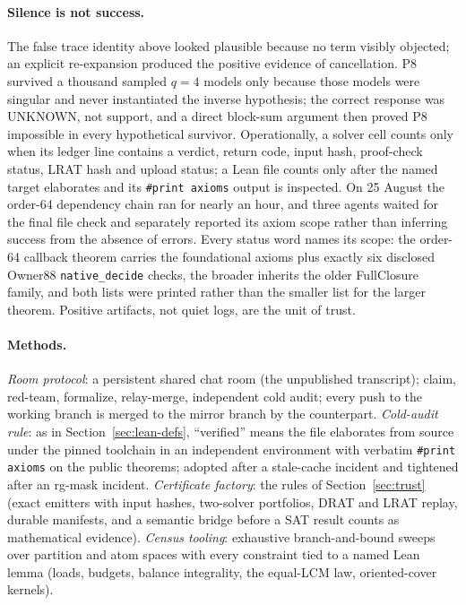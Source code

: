 \documentclass{anvil-paper}
\theoremstyle{definition}
\begin{document}
\paragraph{Silence is not success.} The false trace identity above looked plausible because no term visibly objected; an explicit re-expansion produced the positive evidence of cancellation. P8 survived a thousand sampled $q=4$ models only because those models were singular and never instantiated the inverse hypothesis; the correct response was UNKNOWN, not support, and a direct block-sum argument then proved P8 impossible in every hypothetical survivor. Operationally, a solver cell counts only when its ledger line contains a verdict, return code, input hash, proof-check status, LRAT hash and upload status; a Lean file counts only after the named target elaborates and its \texttt{\#print axioms} output is inspected. On 25 August the order-64 dependency chain ran for nearly an hour, and three agents waited for the final file check and separately reported its axiom scope rather than inferring success from the absence of errors. Every status word names its scope: the order-64 callback theorem  carries the foundational axioms plus exactly six disclosed Owner88 \texttt{native\_decide} checks, the broader  inherits the older FullClosure family, and both lists were printed rather than the smaller list for the larger theorem. Positive artifacts, not quiet logs, are the unit of trust.

\paragraph{Methods.} \emph{Room protocol}: a persistent shared chat room (the unpublished transcript); claim, red-team, formalize, relay-merge, independent cold audit; every push to the working branch is merged to the mirror branch by the counterpart. \emph{Cold-audit rule}: as in Section~\ref{sec:lean-defs}, ``verified'' means the file elaborates from source under the pinned toolchain in an independent environment with verbatim \texttt{\#print axioms} on the public theorems; adopted after a stale-cache incident and tightened after an rg-mask incident. \emph{Certificate factory}: the rules of Section~\ref{sec:trust} (exact emitters with input hashes, two-solver portfolios, DRAT and LRAT replay, durable manifests, and a semantic bridge before a SAT result counts as mathematical evidence). \emph{Census tooling}: exhaustive branch-and-bound sweeps over partition and atom spaces with every constraint tied to a named Lean lemma (loads, budgets, balance integrality, the equal-LCM law, oriented-cover kernels).



\end{document}
